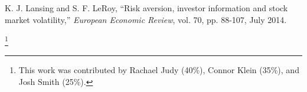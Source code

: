 \documentclass[letterpaper, 11 pt, proceedings]{IEEEtran}
\begin{document}
\begin{thebibliography}{99}
		K. J. Lansing and S. F. LeRoy, “Risk aversion, investor information and stock market volatility,” \textit{European Economic Review}, vol. 70, pp. 88-107, July 2014. 


		

		

%		


	\end{thebibliography}

		

	\thanks{This work was contributed by Rachael Judy (40\%), Connor Klein (35\%), and Josh Smith (25\%).}
\end{document}
